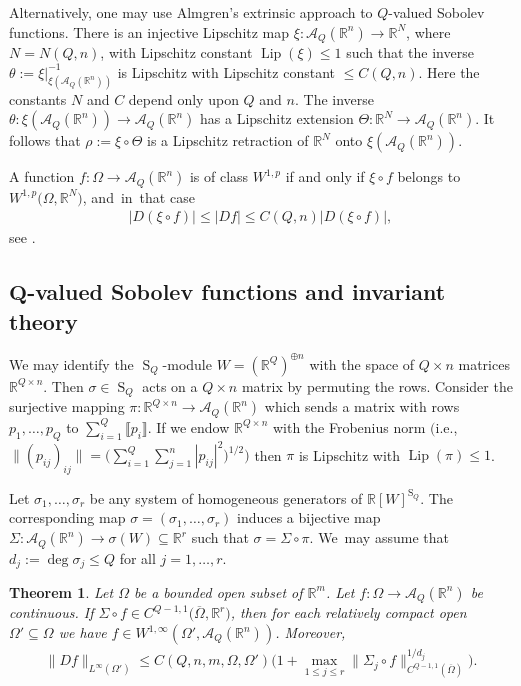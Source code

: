 \documentclass[pdftex]{sigma}
\numberwithin{equation}{section}
\newtheorem{Theorem}{Theorem}[section]
\def\th{\theta}
\def\rh{\rho}
\def\si{\sigma}
\def\Th{\Theta}
\def\Si{\Sigma}
\def\Om{\Omega}
\def\R{\mathbb{R}}
\def\cA{\mathcal{A}}
\def\ol{\overline}
\renewcommand{\o}{\circ}
\let\on=\operatorname
\begin{document}
Alternatively, one may use Almgren's extrinsic approach \cite{Almgren00} to $Q$-valued Sobolev functions.
There is an injective Lipschitz map $\xi \colon \cA_Q(\R^n) \to \R^N$, where $N = N(Q,n)$, with Lipschitz constant
$\on{Lip}(\xi) \le 1$ such that the inverse $\th:= \xi|_{\xi(\cA_Q(\R^n))}^{-1}$ is Lipschitz with Lipschitz constant
\mbox{$\le C(Q,n)$}.
Here the constants $N$ and $C$ depend only upon $Q$ and $n$.
The inverse $\th \colon \xi(\cA_Q(\R^n)) \to \cA_Q(\R^n)$ has a Lipschitz extension $\Th \colon \R^N \to \cA_Q(\R^n)$.
It follows that $\rh :=\xi \o \Th$ is a Lipschitz retraction of $\R^N$ onto $\xi(\cA_Q(\R^n))$.

A function $f \colon \Om \to \cA_Q(\R^n)$ is of class $W^{1,p}$ if and only if
$\xi \o f$ belongs to $W^{1,p}\big(\Om, \R^N\big)$, and~in~that case
\begin{gather} \label{eq:intrextr}
 |D(\xi \o f)| \le |Df| \le C(Q,n) |D(\xi \o f)|,
\end{gather}
see \cite[Theorem 2.4]{De-LellisSpadaro11}.

\subsection[Q-valued Sobolev functions and invariant theory]{$\boldsymbol Q$-valued Sobolev functions and invariant theory}

We may identify the $\on{S}_Q$-module $W = (\R^Q)^{\oplus n}$ with the space of $Q \times n$ matrices $\R^{Q \times n}$.
Then $\si \in \on{S}_Q$ acts on a $Q \times n$ matrix by permuting the rows. Consider the surjective mapping
$\pi \colon \R^{Q \times n} \to \cA_Q(\R^n)$ which sends a matrix with rows $p_1,\dots,p_Q$ to
$\sum_{i=1}^Q \llbracket p_i \rrbracket$. If we endow $\R^{Q \times n}$ with the Frobenius norm
$\big($i.e.,\ $\| (p_{ij})_{ij} \| = \big(\sum_{i=1}^Q \sum_{j=1}^n |p_{ij}|^2\big)^{1/2}\big)$ then $\pi$ is Lipschitz with $\on{Lip}(\pi) \le 1$.

Let $\si_1,\dots,\si_r$ be any system of homogeneous generators of $\R[W]^{\on{S}_Q}$. The corresponding map $\si=(\si_1,\dots,\si_r)$
induces a bijective map $\Si \colon \cA_Q(\R^n) \to \si(W) \subseteq \R^r$ such that $\si = \Si \o \pi$. We~may assume that $d_j := \deg \si_j \le Q$ for all $j = 1,\dots,r$.



\begin{Theorem} \label{thm:Q-valued}
 Let $\Om$ be a bounded open subset of $\R^m$.
 Let $f \colon \Om \to \cA_Q(\R^n)$ be con\-ti\-nuous.
 If $\Si \o f \in C^{Q-1,1}\big(\ol \Om,\R^r\big)$, then
 for each relatively compact open $\Om' \subseteq \Om$ we have
 $f \in W^{1,\infty}(\Om',\cA_Q(\R^n))$.
 Moreover,
 \begin{gather*}
 \|D f\|_{L^\infty(\Om')} \le C(Q,n,m,\Om,\Om') \Big(1 + \max_{1 \le j \le r} \|\Si_j \o f\|^{1/d_j}_{C^{Q-1,1}(\ol \Om)}\Big).
 \end{gather*}
\end{Theorem}
\end{document}
